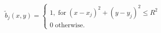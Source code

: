\documentclass[12pt]{standalone}
\begin{document}
$\displaystyle 
\tilde{b}_j(x,y)=\begin{cases}
  1,\; \mathrm{ for }\; (x-x_j)^2+(y-y_j)^2 \leq R^2 \\
  0 \; \mathrm{ otherwise.} 
  \end{cases}
$
\end{document}
